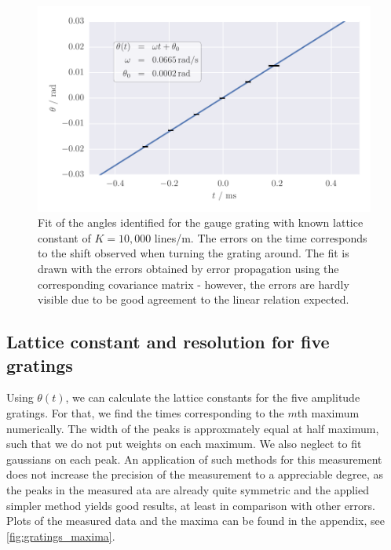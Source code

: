 \begin{figure}[htpb]
    \centering
    \includegraphics[width=1.0\linewidth]{figures/calibrate_fit}
    \caption{
        Fit of the angles identified for the gauge grating with known 
        lattice constant of $K = 10,000$ lines/m. The errors on the time corresponds to the
        shift observed when turning the grating around. The fit is drawn with the errors obtained 
        by error propagation using the corresponding covariance matrix - however, the errors 
        are hardly visible due to be good agreement to the linear relation expected. 
        }
    \label{fig:calibrate_fit}
\end{figure}

\subsection{Lattice constant and resolution for five gratings}
Using $\theta(t)$, we can calculate the lattice constants for the five amplitude gratings. 
For that, we find the times corresponding to the $m$th maximum numerically. The width 
of the peaks is approxmately equal at half maximum, such that we do not put weights 
on each maximum. We also neglect to fit gaussians on each peak. An application of such methods 
for this measurement does not increase the precision of the measurement to a appreciable degree, 
as the peaks in the measured ata are already quite symmetric and the applied simpler method yields 
good results, at least in comparison with other errors. 
Plots of the measured data and the maxima can be found in the appendix, see 
\ref{fig:gratings_maxima}. 


